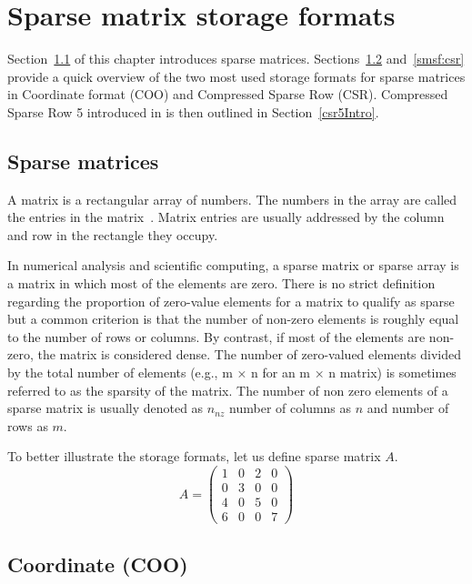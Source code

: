\documentclass[thesis=M,english]{FITthesis}[2019/12/23]
\begin{document}
\chapter{Sparse matrix storage formats}

Section~\ref{smsf:spm} of this chapter introduces sparse matrices. Sections~\ref{smsf:coo} and~\ref{smsf:csr}
provide a quick overview of the two most used storage formats for sparse matrices in Coordinate format (COO)
and Compressed Sparse Row (CSR). Compressed Sparse Row 5 introduced in \cite{liu2015csr5} is then outlined
in Section~\ref{csr5Intro}.


\section{Sparse matrices}\label{smsf:spm}

A matrix is a rectangular array of numbers. The numbers in the array
are called the entries in the matrix~\cite{anton14}. Matrix entries are usually addressed
by the column and row in the rectangle they occupy.

In numerical analysis and scientific computing, a sparse matrix or sparse array
is a matrix in which most of the elements are zero. There is no strict definition
regarding the proportion of zero-value elements for a matrix to qualify as sparse
but a common criterion is that the number of non-zero elements is roughly equal
to the number of rows or columns. By contrast, if most of the elements are non-zero,
the matrix is considered dense.
The number of zero-valued elements divided by the total number of elements (e.g., m × n for an m × n matrix) is sometimes referred to as the sparsity of the matrix.
\cite{efficientSDMM} The number of non zero elements of a sparse matrix is usually denoted
as $n_{nz}$ number of columns as $n$ and number of rows as $m$.

To better illustrate the storage formats, let us define sparse matrix $A$.
\begin{equation*}
    A =
    \begin{pmatrix}
        1 & 0 & 2 & 0 \\
        0 & 3 & 0 & 0 \\
        4 & 0 & 5 & 0 \\
        6 & 0 & 0 & 7
    \end{pmatrix}
\end{equation*}

\section{Coordinate (COO)}\label{smsf:coo}
\end{document}
